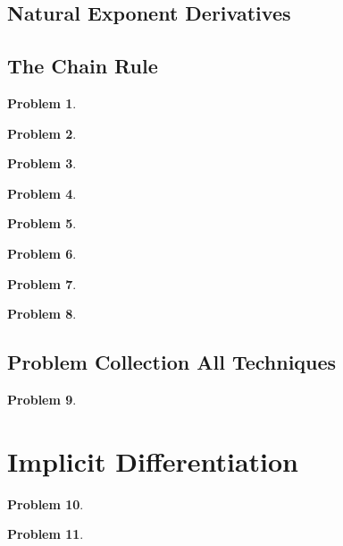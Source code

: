 \documentclass{article}
\newtheorem{problem}{Problem}
\begin{document}
\subsection{Natural Exponent Derivatives}


\subsection{The Chain Rule}
\begin{problem}

\end{problem}
\begin{problem}

\end{problem}
\begin{problem}

\end{problem}
\begin{problem}

\end{problem}
\begin{problem}

\end{problem}
\begin{problem}

\end{problem}
\begin{problem}

\end{problem}
\begin{problem}

\end{problem}
\subsection{Problem Collection All Techniques}
\begin{problem}

\end{problem}


\section{Implicit Differentiation}
\begin{problem}

\end{problem}
\begin{problem}

\end{problem}

\end{document}
